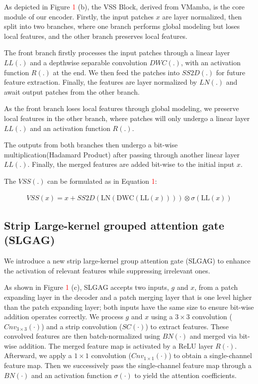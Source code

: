 \documentclass[10pt, a4paper, twocolumn]{article}
\begin{document}
As depicted in Figure \textcolor{red}{1} (b), the VSS Block, derived from VMamba\cite{zhu2024vim,liu2024vmamba}, is the core module of our encoder. Firstly, the input patches $x$ are layer normalized, then split into two branches, where one branch performs global modeling but loses local features, and the other branch preserves local features.

The front branch firstly processes the input patches through a linear layer $LL(.)$ and a depthwise separable convolution $DWC(.)$, with an activation function $R(.)$ at the end. We then feed the patches into $SS2D(.)$ for future feature extraction. Finally, the features are layer normalized by $LN(.)$ and await output patches from the other branch.

As the front branch loses local features through global modeling, we preserve local features in the other branch, where patches will only undergo a linear layer $LL(.)$ and an activation function $R(.)$.

The outputs from both branches then undergo a bit-wise multiplication(Hadamard Product) after passing through another linear layer $LL(.)$. Finally, the merged features are added bit-wise to the initial input $x$.

The $VSS(.)$ can be formulated as in Equation \textcolor{red}{1}:
\begin{scriptsize} 
\begin{align} 
  VSS(x) = x + SS2D\left(\text{LN}\left(\text{DWC}\left(\text{LL}(x)\right)\right)\right) \otimes \sigma\left(\text{LL}(x)\right)
\end{align} 
\end{scriptsize}



\subsection{Strip Large-kernel grouped attention gate (SLGAG)}

We introduce a new strip large-kernel group attention gate (SLGAG) to enhance the activation of relevant features while suppressing irrelevant ones. 

As shown in Figure \textcolor{red}{1} (c), SLGAG accepts two inputs, $g$ and $x$, from a patch expanding layer in the decoder and a patch merging layer that is one level higher than the patch expanding layer; both inputs have the same size to ensure bit-wise addition operates correctly. We process $g$ and $x$ using a $3 \times 3$ convolution ($Cnv_{3\times 3}(\cdot)$) and a strip convolution ($SC(\cdot)$) to extract features. These convolved features are then batch-normalized using $BN(\cdot)$ and merged via bit-wise addition. The merged feature map is activated by a ReLU layer $R(\cdot)$. Afterward, we apply a $1 \times 1$ convolution ($Cnv_{1\times 1}(\cdot)$) to obtain a single-channel feature map. Then we successively pass the single-channel feature map through a $BN(\cdot)$ and an activation function $\sigma(\cdot)$ to yield the attention coefficients. 
\end{document}
